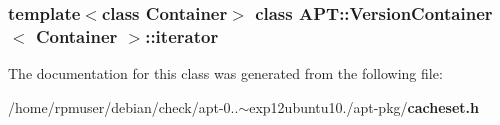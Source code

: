 \subsubsection*{template$<$class \-Container$>$ class A\-P\-T\-::\-Version\-Container$<$ Container $>$\-::iterator}



\-The documentation for this class was generated from the following file\-:\begin{DoxyCompactItemize}
\item 
/home/rpmuser/debian/check/apt-\/0..$\sim$exp12ubuntu10./apt-\/pkg/{\bf cacheset.\-h}\end{DoxyCompactItemize}
